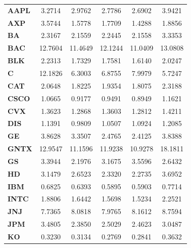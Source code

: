 \documentclass[12pt,letterpaper]{article}
\begin{document}
\begin{enumerate}[label=\textbf{(\Alph*)}]
\begin{table}[ht]
{\begin{tabular}{lccccc}
		\hline
		\textbf{AAPL}  & 3.2714       & 2.9762        & 2.7786       & 2.6902         & 3.9421      \\
		\textbf{AXP}   & 3.5744       & 1.5778        & 1.7709       & 1.4288         & 1.8856      \\
		\textbf{BA}    & 2.3167       & 2.1559        & 2.2445       & 2.1558         & 3.3353      \\
		\textbf{BAC}   & 12.7604      & 11.4649       & 12.1244      & 11.0409        & 13.0808     \\
		\textbf{BLK}   & 2.2313       & 1.7329        & 1.7581       & 1.6140         & 2.0247      \\
		\textbf{C}     & 12.1826      & 6.3003        & 6.8755       & 7.9979         & 5.7247      \\
		\textbf{CAT}   & 2.0648       & 1.8225        & 1.9354       & 1.8075         & 2.3188      \\
		\textbf{CSCO}  & 1.0665       & 0.9177        & 0.9491       & 0.8949         & 1.1621      \\
		\textbf{CVX}   & 1.3623       & 1.2868        & 1.3603       & 1.2812         & 1.4211      \\
		\textbf{DIS}   & 1.1391       & 0.9809        & 1.0507       & 1.0924         & 1.2085      \\
		\textbf{GE}    & 3.8628       & 3.3507        & 2.4765       & 2.4125         & 3.8388      \\
		\textbf{GNTX}  & 12.9547      & 11.1596       & 11.9238      & 10.9278        & 18.1811     \\
		\textbf{GS}    & 3.3944       & 2.1976        & 3.1675       & 3.5596         & 2.6432      \\
		\textbf{HD}    & 3.1479       & 2.6523        & 2.3320       & 2.2735         & 3.6952      \\
		\textbf{IBM}   & 0.6825       & 0.6393        & 0.5895       & 0.5903         & 0.7714      \\
		\textbf{INTC}  & 1.8806       & 1.6442        & 1.5698       & 1.5234         & 2.2521      \\
		\textbf{JNJ}   & 7.7365       & 8.0818        & 7.9765       & 8.1612         & 8.7594      \\
		\textbf{JPM}   & 3.4805       & 2.3850        & 2.5029       & 2.4623         & 3.0487      \\
		\textbf{KO}    & 0.3230       & 0.3134        & 0.2769       & 0.2841         & 0.3632      \\

\end{tabular}}
\end{table}
\end{enumerate}
\end{document}
